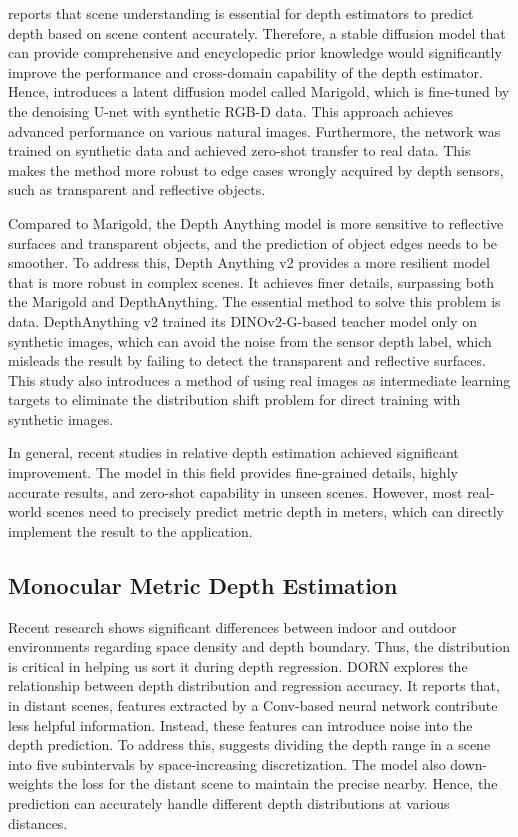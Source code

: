 \documentclass{article}
\begin{document}
\cite{Marigold} reports that scene understanding is essential for depth estimators to predict depth based on scene content accurately. Therefore, a stable diffusion model that can provide comprehensive and encyclopedic prior knowledge would significantly improve the performance and cross-domain capability of the depth estimator. Hence, \cite{Marigold} introduces a latent diffusion model called Marigold, which is fine-tuned by the denoising U-net with synthetic RGB-D data. This approach achieves advanced performance on various natural images. Furthermore, the network was trained on synthetic data and achieved zero-shot transfer to real data. This makes the method more robust to edge cases wrongly acquired by depth sensors, such as transparent and reflective objects.

Compared to Marigold, the Depth Anything model is more sensitive to reflective surfaces and transparent objects, and the prediction of object edges needs to be smoother. To address this, Depth Anything v2 \cite{depth_anything_v2} provides a more resilient model that is more robust in complex scenes. It achieves finer details, surpassing both the Marigold and DepthAnything. The essential method to solve this problem is data. DepthAnything v2 trained its DINOv2-G-based teacher model only on synthetic images, which can avoid the noise from the sensor depth label, which misleads the result by failing to detect the transparent and reflective surfaces. This study also introduces a method of using real images as intermediate learning targets to eliminate the distribution shift problem for direct training with synthetic images.

In general, recent studies in relative depth estimation achieved significant improvement. The model in this field provides fine-grained details, highly accurate results, and zero-shot capability in unseen scenes. However, most real-world scenes need to precisely predict metric depth in meters, which can directly implement the result to the application.
    
\subsection{Monocular Metric Depth Estimation}
Recent research shows significant differences between indoor and outdoor environments regarding space density and depth boundary. Thus, the distribution is critical in helping us sort it during depth regression. DORN \cite{FuCVPR18-DORN} explores the relationship between depth distribution and regression accuracy. It reports that, in distant scenes, features extracted by a Conv-based neural network contribute less helpful information. Instead, these features can introduce noise into the depth prediction.
To address this, \cite{FuCVPR18-DORN} suggests dividing the depth range in a scene into five subintervals by space-increasing discretization. The model also down-weights the loss for the distant scene to maintain the precise nearby. Hence, the prediction can accurately handle different depth distributions at various distances.
\end{document}
